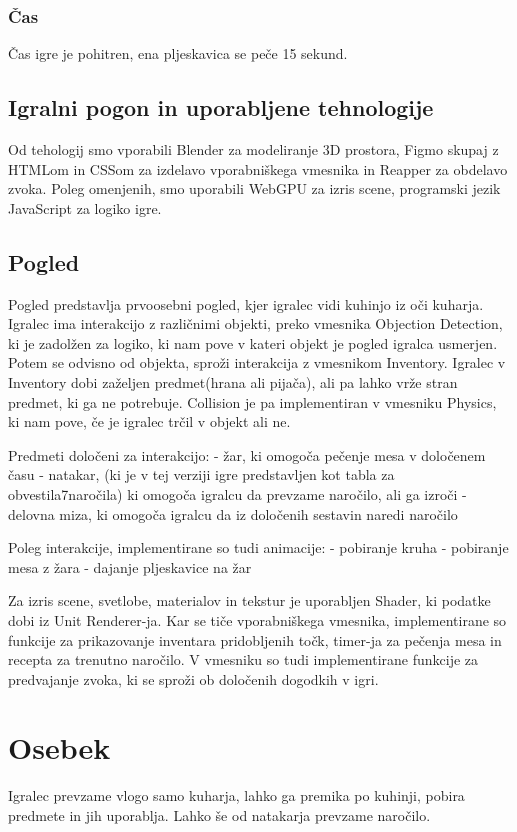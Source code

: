\documentclass[a4paper]{article}
\begin{document}
\subsubsection{Čas}
Čas igre je pohitren, ena pljeskavica se peče 15 sekund.

\subsection{Igralni pogon in uporabljene tehnologije}
Od tehologij smo vporabili Blender za modeliranje 3D prostora, Figmo skupaj z HTMLom in CSSom za izdelavo vporabniškega vmesnika in Reapper za obdelavo zvoka.
Poleg omenjenih, smo uporabili WebGPU za izris scene, programski jezik JavaScript za logiko igre.

\subsection{Pogled}
Pogled predstavlja prvoosebni pogled, kjer igralec vidi kuhinjo iz oči kuharja. Igralec ima interakcijo z različnimi objekti, preko vmesnika Objection Detection, ki je zadolžen za logiko, ki nam pove v kateri objekt je pogled igralca usmerjen.
Potem se odvisno od objekta, sproži interakcija z vmesnikom Inventory. Igralec v Inventory dobi zaželjen predmet(hrana ali pijača), ali pa lahko vrže stran predmet, ki ga ne potrebuje.
Collision je pa implementiran v vmesniku Physics, ki nam pove, če je igralec trčil v objekt ali ne.

Predmeti določeni za interakcijo: 
- žar, ki omogoča pečenje mesa v določenem času
- natakar, (ki je v tej verziji igre predstavljen kot tabla za obvestila7naročila) ki omogoča igralcu da prevzame naročilo, ali ga izroči
- delovna miza, ki omogoča igralcu da iz določenih sestavin naredi naročilo

Poleg interakcije, implementirane so tudi animacije:
- pobiranje kruha
- pobiranje mesa z žara 
- dajanje pljeskavice na žar

Za izris scene, svetlobe, materialov in tekstur je uporabljen Shader, ki podatke dobi iz Unit Renderer-ja. Kar se tiče vporabniškega vmesnika, implementirane so funkcije za prikazovanje inventara pridobljenih točk,
timer-ja za pečenja mesa in recepta za trenutno naročilo. V vmesniku so tudi implementirane funkcije za predvajanje zvoka, ki se sproži ob določenih dogodkih v igri.

\section{Osebek}
Igralec prevzame vlogo samo kuharja, lahko ga premika po kuhinji, pobira predmete in jih uporablja. Lahko še od natakarja prevzame naročilo.
\end{document}
